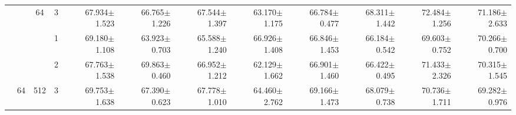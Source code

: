\begin{table}[htpb]
{\begin{tabular}{c|c|c|c|rr|rr|rr|rr}
                                 &                                                                                 & \multirow{-3}{*}{64}                                                                   & 3                                                                                         & 67.934$\pm$1.523                        & 66.765$\pm$1.226                        & 67.544$\pm$1.397                        & 63.170$\pm$1.175                        & 66.784$\pm$0.477                        & 68.311$\pm$1.442                        & 72.484$\pm$1.256                        & 71.186$\pm$2.633                       \\ \cline{3-12} 
                                 &                                                                                 &                                                                                        & 1                                                                                         & 69.180$\pm$1.108                        & 63.923$\pm$0.703                        & 65.588$\pm$1.240                        & 66.926$\pm$1.408                        & 66.846$\pm$1.453                        & 66.184$\pm$0.542                        & 69.603$\pm$0.752                        & 70.266$\pm$0.700                       \\
                                 &                                                                                 &                                                                                        & 2                                                                                         & 67.763$\pm$1.538                        & 69.863$\pm$0.460                        & 66.952$\pm$1.212                        & 62.129$\pm$1.662                        & 66.901$\pm$1.460                        & 66.422$\pm$0.495                        & 71.433$\pm$2.326                        & 70.315$\pm$1.545                       \\
                                 & \multirow{-6}{*}{64}                                                            & \multirow{-3}{*}{512}                                                                  & 3                                                                                         & 69.753$\pm$1.638                        & 67.390$\pm$0.623                        & 67.778$\pm$1.010                        & 64.460$\pm$2.762                        & 69.166$\pm$1.473                        & 68.079$\pm$0.738                        & 70.736$\pm$1.711                        & 69.282$\pm$0.976                       \\ \cline{2-12} 

\end{tabular}}
\end{table}
